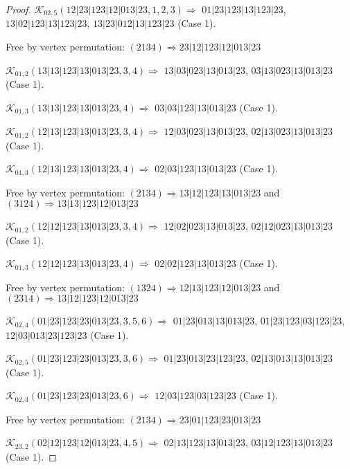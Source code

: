 \documentclass[12pt]{article}
\theoremstyle{plain}
\theoremstyle{definition}
\theoremstyle{remark}
\newcommand{\fancy}[1]{\mathcal{#1}}
\def\K{\fancy{K}}
\begin{document}
\begin{proof}
	$\K_{02,5}(12|23|123|12|013|23,1, 2, 3)\Rightarrow $ $01|23|123|13|123|23$, $13|02|123|13|123|23$, $13|23|012|13|123|23$ (Case 1).
	
	
	
	Free by vertex permutation: $(2 1 3 4)\Rightarrow 23|12|123|12|013|23$
	
	
	
	\bigskip
	
	$\K_{01,2}(13|13|123|13|013|23,3, 4)\Rightarrow $ $13|03|023|13|013|23$, $03|13|023|13|013|23$ (Case 1).
	
	$\K_{01,3}(13|13|123|13|013|23,4)\Rightarrow $ $03|03|123|13|013|23$ (Case 1).
	
	
	\bigskip
	
	$\K_{01,2}(12|13|123|13|013|23,3, 4)\Rightarrow $ $12|03|023|13|013|23$, $02|13|023|13|013|23$ (Case 1).
	
	$\K_{01,3}(12|13|123|13|013|23,4)\Rightarrow $ $02|03|123|13|013|23$ (Case 1).
	
	
	
	Free by vertex permutation: $(2 1 3 4)\Rightarrow 13|12|123|13|013|23$ and $(3 1 2 4)\Rightarrow 13|13|123|12|013|23$
	
	
	
	\bigskip
	
	$\K_{01,2}(12|12|123|13|013|23,3, 4)\Rightarrow $ $12|02|023|13|013|23$, $02|12|023|13|013|23$ (Case 1).
	
	$\K_{01,3}(12|12|123|13|013|23,4)\Rightarrow $ $02|02|123|13|013|23$ (Case 1).
	
	
	
	Free by vertex permutation: $(1 3 2 4)\Rightarrow 12|13|123|12|013|23$ and $(2 3 1 4)\Rightarrow 13|12|123|12|013|23$
	
	
	
	\bigskip
	
	$\K_{02,4}(01|23|123|23|013|23,3, 5, 6)\Rightarrow $ $01|23|013|13|013|23$, $01|23|123|03|123|23$, $12|03|013|23|123|23$ (Case 1).
	
	$\K_{02,5}(01|23|123|23|013|23,3, 6)\Rightarrow $ $01|23|013|23|123|23$, $02|13|013|13|013|23$ (Case 1).
	
	$\K_{02,3}(01|23|123|23|013|23,6)\Rightarrow $ $12|03|123|03|123|23$ (Case 1).
	
	
	
	Free by vertex permutation: $(2 1 3 4)\Rightarrow 23|01|123|23|013|23$
	
	
	
	\bigskip
	
	$\K_{23,2}(02|12|123|12|013|23,4, 5)\Rightarrow $ $02|13|123|13|013|23$, $03|12|123|13|013|23$ (Case 1).
	

\end{proof}
\end{document}
